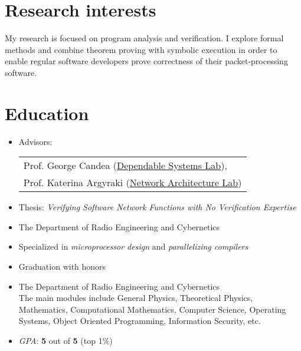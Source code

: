 \documentclass[letterpaper]{resume}
\begin{document}
\author{Arseniy Yurievich Zaostrovnykh}
\date{\today}
\maketitle

\section{Research interests}
My research is focused on program analysis and verification.
I explore formal methods and combine theorem proving with symbolic execution in
order to enable regular software developers prove correctness of their packet-processing software.

\section{Education}

\begin{itemize}
  \item Advisors: \begin{tabular}{l}
    Prof. George Candea (\href{http://dslab.epfl.ch}{Dependable Systems Lab}),\\
    Prof. Katerina Argyraki (\href{http://nal.epfl.ch}{Network Architecture Lab})
  \end{tabular}
  \item Thesis: \emph{Verifying Software Network Functions with No Verification Expertise}
\end{itemize}

\begin{itemize}
    \item The Department of Radio Engineering and Cybernetics
    \item Specialized in \emph{microprocessor design} and \emph{parallelizing compilers}
    \item Graduation with honors
\end{itemize}

\begin{itemize}
    \item The Department of Radio Engineering and Cybernetics\\ The main modules include General Physics,
      Theoretical Physics, Mathematics, Computational Mathematics,
      Computer Science, Operating Systems, Object Oriented Programming, Information Security, etc.
    \item \emph{GPA}: {\bf 5%
    } out of {\bf 5} (top 1\%)
\end{itemize}
\end{document}
